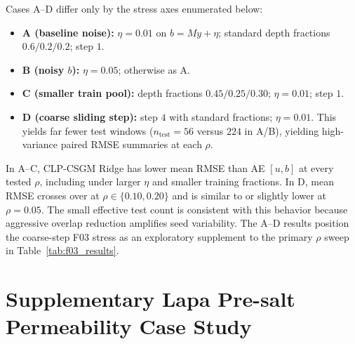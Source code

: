 Cases A--D differ only by the stress axes enumerated below:
\begin{itemize}
  \item \textbf{A (baseline noise):} \(\eta{=}0.01\) on \(b{=}My+\eta\); standard depth fractions \(0.6/0.2/0.2\); step \(1\).
  \item \textbf{B (noisy \(b\)):} \(\eta{=}0.05\); otherwise as A.
  \item \textbf{C (smaller train pool):} depth fractions \(0.45/0.25/0.30\); \(\eta{=}0.01\); step \(1\).
  \item \textbf{D (coarse sliding step):} step \(4\) with standard fractions;
  \(\eta{=}0.01\). This yields far fewer test windows
  (\(n_{\mathrm{test}}{=}56\) versus \(224\) in A/B), yielding high-variance
  paired RMSE summaries at each \(\rho\).
\end{itemize}

\begin{table}[htbp]
  \centering
  \caption{F03-4 GR-only stress tests: mean RMSE across seeds for AE \([u,b]\) versus CLP-CSGM Ridge.
  Relative RMSE gap is \((\mathrm{RMSE}_{\mathrm{AE}}-\mathrm{RMSE}_{\mathrm{Ridge}})/\mathrm{RMSE}_{\mathrm{AE}}\) in percent (positive favors Ridge).
  Test counts \(n_{\mathrm{test}}\) count windows in the test depth segment after sliding-window construction.}
  \label{tab:f03_stress}
  \small
\end{table}

In A--C, CLP-CSGM Ridge has lower mean RMSE than AE \([u,b]\) at every tested
\(\rho\), including under larger \(\eta\) and smaller training fractions. In D,
mean RMSE crosses over at \(\rho\in\{0.10,0.20\}\) and is similar to or slightly
lower at \(\rho{=}0.05\). The small effective test count is consistent with this
behavior because aggressive overlap reduction amplifies seed variability.
The A--D results position the coarse-step F03 stress as an exploratory supplement
to the primary \(\rho\) sweep in Table~\ref{tab:f03_results}.

\section{Supplementary Lapa Pre-salt Permeability Case Study}
\label{app:lapa_case}

